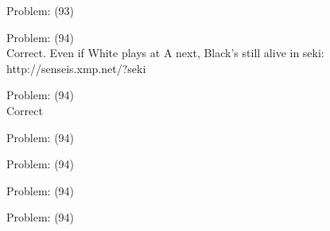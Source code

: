 \documentclass[11pt]{article}
\begin{document}
\begin{minipage}[t]{0.5\textwidth}
  {\centering
  
  Problem: (93)\\
  
  }
\end{minipage}
\begin{minipage}[t]{0.5\textwidth}
  {\centering
  
  Problem: (94)\\
  Correct. Even if White plays at A next, Black's still alive in seki: http://senseis.xmp.net/?seki\\
  }
\end{minipage}
\begin{minipage}[t]{0.5\textwidth}
  {\centering
  
  Problem: (94)\\
  Correct\\
  }
\end{minipage}
\begin{minipage}[t]{0.5\textwidth}
  {\centering
  
  Problem: (94)\\
  
  }
\end{minipage}
\begin{minipage}[t]{0.5\textwidth}
  {\centering
  
  Problem: (94)\\
  
  }
\end{minipage}
\begin{minipage}[t]{0.5\textwidth}
  {\centering
  
  Problem: (94)\\
  
  }
\end{minipage}
\begin{minipage}[t]{0.5\textwidth}
  {\centering
  
  Problem: (94)\\
  
  }
\end{minipage}
\end{document}
